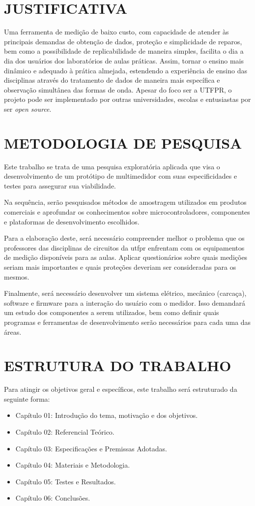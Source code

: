 \section{JUSTIFICATIVA}\label{sec:justificativa}
Uma ferramenta de medição de baixo custo, com capacidade de atender às principais demandas de obtenção de dados, proteção e simplicidade de reparos, bem como a possibilidade de replicabilidade de maneira simples, facilita o dia a dia dos usuários dos laboratórios de aulas práticas. Assim, tornar o ensino mais dinâmico e adequado à prática almejada, estendendo a experiência de ensino das disciplinas através do tratamento de dados de maneira mais específica e observação simultânea das formas de onda.
Apesar do foco ser a UTFPR, o projeto pode ser implementado por outras universidades, escolas e entusiastas por ser \textit{open source}.

\section{METODOLOGIA DE PESQUISA}\label{sec:metodologiapesq}
Este trabalho se trata de uma pesquisa exploratória aplicada que visa o desenvolvimento de um protótipo de multimedidor com suas especificidades e testes para assegurar sua viabilidade.

Na sequência, serão pesquisados métodos de amostragem utilizados em produtos comerciais e aprofundar os conhecimentos sobre microcontroladores, componentes e plataformas de desenvolvimento escolhidos.

Para a elaboração deste, será necessário compreender melhor o problema que os professores das disciplinas de circuitos da \gls{utfpr} enfrentam com os equipamentos de medição disponíveis para as aulas. Aplicar questionários sobre quais medições seriam mais importantes e quais proteções deveriam ser consideradas para os mesmos.

Finalmente, será necessário desenvolver um sistema elétrico, mecânico (carcaça), software e firmware para a interação do usuário com o medidor. Isso demandará um estudo dos componentes a serem utilizados, bem como definir quais programas e ferramentas de desenvolvimento serão necessários para cada uma das áreas.


\section{ESTRUTURA DO TRABALHO}\label{sec:estruturatrab}

Para atingir os objetivos geral e específicos, este trabalho será estruturado da seguinte forma:

\begin{itemize}
    \item Capítulo 01: Introdução do tema, motivação e dos objetivos.
    \item Capítulo 02: Referencial Teórico.
    \item Capítulo 03: Especificações e Premissas Adotadas.
    \item Capítulo 04: Materiais e Metodologia.
    \item Capítulo 05: Testes e Resultados.
    \item Capítulo 06: Conclusões.
\end{itemize}

